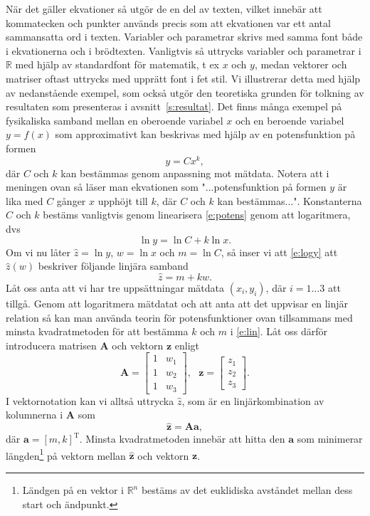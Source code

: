 \documentclass[a4paper]{article}
\begin{document}
När det gäller ekvationer så utgör de en del av texten, vilket innebär att kommatecken och punkter används precis som att ekvationen var ett antal sammansatta ord i texten. Variabler och parametrar skrivs med samma font både i ekvationerna och i brödtexten. Vanligtvis så uttrycks variabler och parametrar i $\mathbb{R}$ med hjälp av standardfont för matematik, t ex $x$ och $y$, medan vektorer och matriser oftast uttrycks med upprätt font i fet stil. Vi illustrerar detta med hjälp av nedanstående exempel, som också utgör den teoretiska grunden för tolkning av resultaten som presenteras i avsnitt~\ref{s:resultat}. Det finns många exempel på fysikaliska samband mellan en oberoende variabel $x$ och en beroende variabel $y=f(x)$ som approximativt kan beskrivas med hjälp av en potensfunktion på formen
%
\begin{equation} \label{e:potens}
    y=C x^k,
\end{equation}
%
där $C$ och $k$ kan bestämmas genom anpassning mot mätdata. Notera att i meningen ovan så läser man ekvationen som "...potensfunktion på formen $y$ är lika med $C$ gånger $x$ upphöjt till $k$, där $C$ och $k$ kan bestämmas...". Konstanterna $C$ och $k$ bestäms vanligtvis genom linearisera \eqref{e:potens} genom att logaritmera, dvs
%
\begin{equation}\label{e:logy}
    \ln y = \ln C + k \ln x.
\end{equation}
%
Om vi nu låter $\hat{z}=\ln y$, $w=\ln x$ och $m=\ln C$, så inser vi att \eqref{e:logy} att $\hat{z}(w)$ beskriver följande linjära samband
%
\begin{equation}\label{e:lin}
    \hat{z} = m + k w.
\end{equation}
%
Låt oss anta att vi har tre uppsättningar mätdata $(x_i, y_i)$, där $i=1\ldots3$ att tillgå. Genom att logaritmera mätdatat och att anta att det uppvisar en linjär relation så kan man använda teorin för potensfunktioner ovan tillsammans med minsta kvadratmetoden för att bestämma $k$ och $m$ i \eqref{e:lin}. Låt oss därför introducera matrisen $\mathbf{A}$ och vektorn $\mathbf{z}$ enligt
%
\begin{equation}
    \mathbf{A}=\begin{bmatrix}
    1&w_1\\
    1&w_2\\
    1&w_3
    \end{bmatrix},
~~~
    \mathbf{z}=\begin{bmatrix}
    z_1\\
    z_2\\
    z_3
    \end{bmatrix}.
\end{equation}
%
I vektornotation kan vi alltså uttrycka ${\hat{z}}$, som är en linjärkombination av kolumnerna i $\mathbf{A}$ som
%
\begin{equation}\label{e:zhat}
    \mathbf{\hat{z}}=\mathbf{A}\mathbf{a},
\end{equation}
%
där $\mathbf{a}=[m,k]^\mathrm{T}$. Minsta kvadratmetoden innebär att hitta den $\mathbf{a}$ som minimerar längden\footnote{Ländgen på en vektor i $\mathbb{R}^n$ bestäms av det euklidiska avståndet mellan dess start och ändpunkt.} på vektorn  mellan $\mathbf{\hat{z}}$ och vektorn $\mathbf{z}$. 
\end{document}
